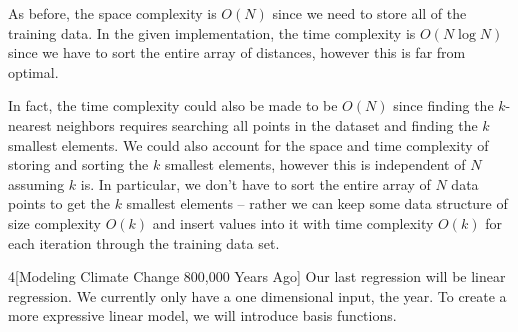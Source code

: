 \documentclass[expanded]{lkx_pset}
\begin{document}
\begin{parts}
	As before, the space complexity is $O(N)$ since we need to store all of the training data. In the given implementation, the time complexity is $O(N\log N)$ since we have to sort the entire array of distances, however this is far from optimal.

	In fact, the time complexity could also be made to be $O(N)$ since finding the $k$-nearest neighbors requires searching all points in the dataset and finding the $k$ smallest elements. We could also account for the space and time complexity of storing and sorting the $k$ smallest elements, however this is independent of $N$ assuming $k$ is. In particular, we don't have to sort the entire array of $N$ data points to get the $k$ smallest elements -- rather we can keep some data structure of size complexity $O(k)$ and insert values into it with time complexity $O(k)$ for each iteration through the training data set.
\end{parts}

\begin{problem}{4}[Modeling Climate Change 800,000 Years Ago]
Our last regression will be linear regression.  We currently only have
a one dimensional input, the year.  To create a more expressive linear
model, we will introduce basis functions.
\end{problem}
\end{document}
